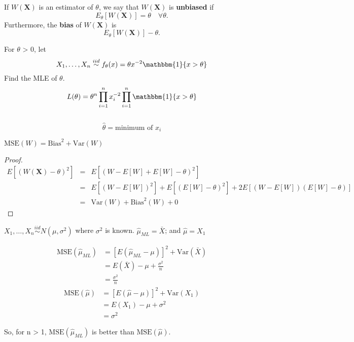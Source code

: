 \documentclass[11pt,fleqn]{book} %
\begin{document}
	\begin{definition}

	If $W(\bm{X})$ is an estimator of $\theta$, we say that $W(\bm{X})$ is \textbf{unbiased} if
	\[
		E_\theta[W(\bm{X})] = \theta \quad \forall \theta.
	\]
	Furthermore, the \textbf{bias} of $W(\bm{X})$ is
	\[
		E_\theta[W(\bm{X})] - \theta.
	\]

	\end{definition}

	\begin{example}
		For $\theta$ > 0, let
		$$
			X_1, \dots, X_n \stackrel{iid}{\sim} f_\theta(x)=\theta x^{-2} \mathbbm{1}\{x>\theta\}
		$$
	Find the MLE of $\theta$.
	$$
		L(\theta)=\theta^n \prod_{i=1}^n x_i^{-2} \prod_{i=1}^n \mathbbm{1}\{x>\theta\}$$
		\\
		$$\hat{\theta}=\text{minimum of }x_i
	$$
	\end{example}

	\begin{theorem}
	$\textrm{MSE}(W) = \textrm{Bias}^2 + \textrm{Var}(W)$
	\end{theorem}

	\begin{proof}
	\begin{eqnarray*}
		E[(W(\bm{X})-\theta)^2] &=& E[(W-E[W]+E[W]-\theta)^2]\\
								&=& E[(W-E[W])^2]+E[(E[W]-\theta)^2]+2E[(W-E[W])(E[W]-\theta)]\\
								&=& \textrm{Var}(W) + \textrm{Bias}^2(W) + 0
	\end{eqnarray*}	
	\end{proof}
	
	\begin{example}
		$X_1, \dots, X_n \stackrel{iid}{\sim} N(\mu, \sigma^2)$ where $\sigma^2$ is known.
		$\hat{\mu}_{ML} = \bar{X}$; and $\hat{\mu} = X_1$

		\begin{multicols}{2}
		  \begin{align*}
		    \text{MSE}(\hat{\mu}_{ML}) &= [E(\hat{\mu}_{ML} - \mu)]^2 + \text{Var}(\bar{X})\\
		    	&= E(\bar{X}) - \mu + \frac{\sigma^2}{n}\\
		    	&= \frac{\sigma^2}{n}
		  \end{align*}\break
		  \begin{align*}
		    \text{MSE}(\hat{\mu}) &= [E(\hat{\mu} - \mu)]^2 + \text{Var}(X_1)\\
		    	&= E(X_1) - \mu + \sigma^2\\
		    	&= \sigma^2
		  \end{align*}
		\end{multicols}

		So, for n > 1, $\text{MSE}(\hat{\mu}_{ML})$ is better than $\text{MSE}(\hat{\mu})$.
	\end{example}
\end{document}
